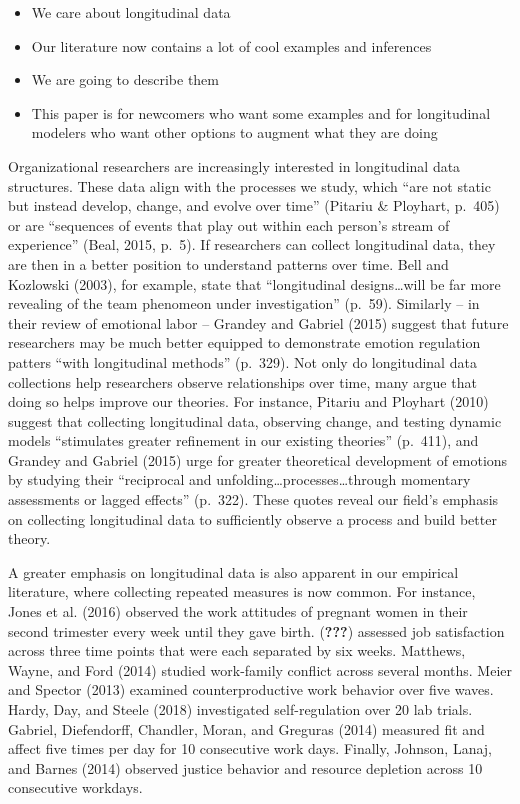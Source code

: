 \documentclass[english,,man]{apa6}
\providecommand{\tightlist}{%
  \setlength{\itemsep}{0pt}\setlength{\parskip}{0pt}}
\theoremstyle{definition}
\theoremstyle{definition}
\theoremstyle{definition}
\theoremstyle{remark}
\begin{document}
\begin{itemize}
\tightlist
\item
  We care about longitudinal data
\item
  Our literature now contains a lot of cool examples and inferences
\item
  We are going to describe them
\item
  This paper is for newcomers who want some examples and for
  longitudinal modelers who want other options to augment what they are
  doing
\end{itemize}

Organizational researchers are increasingly interested in longitudinal
data structures. These data align with the processes we study, which
\enquote{are not static but instead develop, change, and evolve over
time} (Pitariu \& Ployhart, p.~405) or are \enquote{sequences of events
that play out within each person's stream of experience} (Beal, 2015,
p.~5). If researchers can collect longitudinal data, they are then in a
better position to understand patterns over time. Bell and Kozlowski
(2003), for example, state that \enquote{longitudinal
designs\ldots{}will be far more revealing of the team phenomeon under
investigation} (p.~59). Similarly -- in their review of emotional labor
-- Grandey and Gabriel (2015) suggest that future researchers may be
much better equipped to demonstrate emotion regulation patters
\enquote{with longitudinal methods} (p.~329). Not only do longitudinal
data collections help researchers observe relationships over time, many
argue that doing so helps improve our theories. For instance, Pitariu
and Ployhart (2010) suggest that collecting longitudinal data, observing
change, and testing dynamic models \enquote{stimulates greater
refinement in our existing theories} (p.~411), and Grandey and Gabriel
(2015) urge for greater theoretical development of emotions by studying
their \enquote{reciprocal and unfolding\ldots{}processes\ldots{}through
momentary assessments or lagged effects} (p.~322). These quotes reveal
our field's emphasis on collecting longitudinal data to sufficiently
observe a process and build better theory.

A greater emphasis on longitudinal data is also apparent in our
empirical literature, where collecting repeated measures is now common.
For instance, Jones et al. (2016) observed the work attitudes of
pregnant women in their second trimester every week until they gave
birth. ({\textbf{???}}) assessed job satisfaction across three time
points that were each separated by six weeks. Matthews, Wayne, and Ford
(2014) studied work-family conflict across several months. Meier and
Spector (2013) examined counterproductive work behavior over five waves.
Hardy, Day, and Steele (2018) investigated self-regulation over 20 lab
trials. Gabriel, Diefendorff, Chandler, Moran, and Greguras (2014)
measured fit and affect five times per day for 10 consecutive work days.
Finally, Johnson, Lanaj, and Barnes (2014) observed justice behavior and
resource depletion across 10 consecutive workdays.
\end{document}
